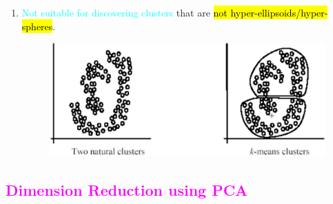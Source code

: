 \documentclass{book}
\begin{document}
\begin{enumerate}
    \item \textcolor{cyan}{Not suitable for discovering clusters} that are \hl{not hyper-ellipsoids/hyper-spheres}.
    \begin{figure}[h]
        \centering
        \includegraphics[scale=0.25]{chapter 5/ch5_figure13.jpeg}
    \end{figure}
\end{enumerate}
\textcolor{magenta}{\section{\textbf{Dimension Reduction using PCA}}}
\end{document}
